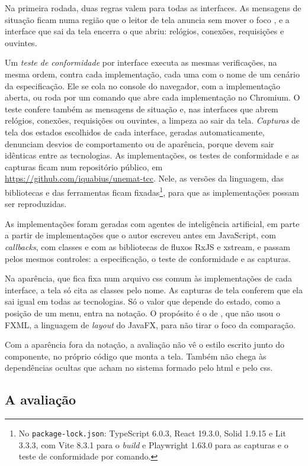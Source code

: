 Na primeira rodada, duas regras valem para todas as interfaces.
As mensagens de situação ficam numa região que o leitor de tela anuncia
sem mover o foco \cite[critério 4.1.3]{w3c2024}, e a interface que sai da tela encerra o que abriu:
relógios, conexões, requisições e ouvintes.

Um \emph{teste de conformidade} por interface executa as mesmas verificações,
na mesma ordem, contra cada implementação, cada uma com o nome de um
cenário da especificação.
Ele se cola no console do navegador, com a implementação aberta, ou roda
por um comando que abre cada implementação no Chromium.
O teste confere também as mensagens de situação e, nas interfaces que
abrem relógios, conexões, requisições ou ouvintes, a limpeza ao sair da
tela.
\emph{Capturas} de tela dos estados escolhidos de cada interface, geradas
automaticamente, denunciam desvios de comportamento ou de aparência,
porque devem sair idênticas entre as tecnologias.
As implementações, os testes de conformidade e as capturas ficam num
repositório público, em \url{https://github.com/iquabius/unemat-tcc}.
Nele, as versões da linguagem, das bibliotecas e das ferramentas ficam
fixadas\footnote{No \texttt{package-lock.json}: TypeScript 6.0.3, React 19.3.0,
Solid 1.9.15 e Lit 3.3.3, com Vite 8.3.1 para o \emph{build} e Playwright
1.63.0 para as capturas e o teste de conformidade por comando.}, para que as implementações possam ser reproduzidas.

As implementações foram geradas com agentes de inteligência artificial,
em parte a partir de implementações que o autor escreveu antes em
JavaScript, com \emph{callbacks}, com classes e com as bibliotecas de fluxos
RxJS e xstream, e passam pelos mesmos controles: a especificação, o
teste de conformidade e as capturas.

Na aparência, que fica fixa num arquivo \gls{css} comum às
implementações de cada interface, a tela só cita as classes pelo nome.
As capturas de tela conferem que ela sai igual em todas as tecnologias.
Só o valor que depende do estado, como a posição de um menu, entra na
notação.
O propósito é o de \textcite[p. 16]{kiss2014}, que não usou o FXML, a
linguagem de \emph{layout} do JavaFX, para não tirar o foco da comparação.

Com a aparência fora da notação, a avaliação não vê o estilo escrito
junto do componente, no próprio código que monta a tela.
Também não chega às dependências ocultas que
\textcite[p. 342]{green2006} acham no sistema formado pelo \gls{html}
e pelo \gls{css}.
\subsection{A avaliação}
\label{sec:a-avaliacao}

